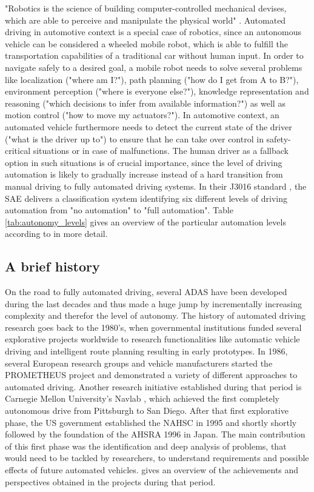 "Robotics is the science of building computer-controlled mechanical devises, which are able to perceive and manipulate the physical world" \cite{Thrun2005}.
Automated driving in automotive context is a special case of robotics, since an autonomous vehicle can be considered a wheeled mobile robot, which is able to fulfill the transportation capabilities of a traditional car without human input.
In order to navigate safely to a desired goal, a mobile robot needs to solve several problems like localization ("where am I?"), path planning ("how do I get from A to B?"), environment perception ("where is everyone else?"), knowledge representation and reasoning ("which decisions to infer from available information?") as well as motion control ("how to move my actuators?").
In automotive context, an automated vehicle furthermore needs to detect the current state of the driver ("what is the driver up to") to ensure that he can take over control in safety-critical situations or in case of malfunctions.
The human driver as a fallback option in such situations is of crucial importance, since the level of driving automation is likely to gradually increase instead of a hard transition from manual driving to fully automated driving systems.
In their J3016 standard \cite{SAE_J3016}, the \ac{SAE} delivers a classification system identifying six different levels of driving automation from "no automation" to "full automation".
Table \ref{tab:autonomy_levels} gives an overview of the particular automation levels according to \cite{SAE_J3016} in more detail.

\subsection{A brief history}
\label{subsec:aut_driving_hist}

On the road to fully automated driving, several \ac{ADAS} have been developed during the last decades and thus made a huge jump by incrementally increasing complexity and therefor the level of autonomy.
The history of automated driving research goes back to the 1980's, when governmental institutions funded several explorative projects worldwide to research functionalities like automatic vehicle driving and intelligent route planning resulting in early prototypes.
In 1986, several European research groups and vehicle manufacturers started the \ac{PROMETHEUS} project \cite{Dickmanns1990} and demonstrated a variety of different approaches to automated driving.
Another research initiative established during that period is Carnegie Mellon University's Navlab \cite{Thorpe1988}, which achieved the first completely autonomous drive from Pittsburgh to San Diego.
After that first explorative phase, the US government established the \ac{NAHSC} in 1995 and shortly shortly followed by the foundation of the \ac{AHSRA} 1996 in Japan.
The main contribution of this first phase was the identification and deep analysis of problems, that would need to be tackled by researchers, to understand requirements and possible effects of future automated vehicles.
\cite{Bertozzi2000} gives an overview of the achievements and perspectives obtained in the projects during that period.

